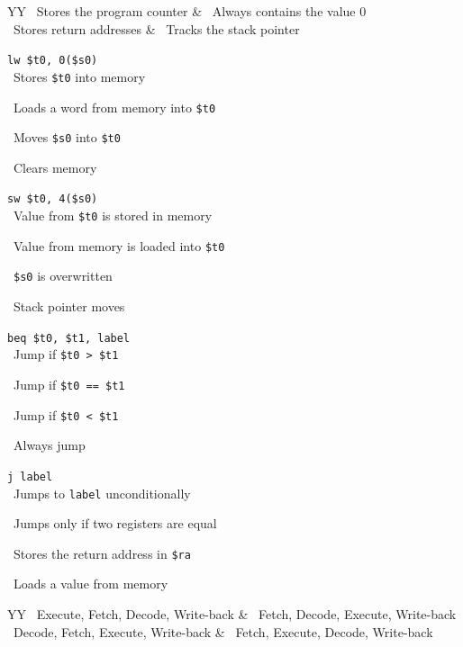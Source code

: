 \begin{tabularx}{\linewidth}{YY}
\formbox\ Stores the program counter & \formbox\ Always contains the value 0 \\
\formbox\ Stores return addresses & \formbox\ Tracks the stack pointer \\
\end{tabularx}

\texttt{lw \$t0, 0(\$s0)}\\
\formbox\ Stores \texttt{\$t0} into memory

\formbox\ Loads a word from memory into \texttt{\$t0}

\formbox\ Moves \texttt{\$s0} into \texttt{\$t0}

\formbox\ Clears memory

\texttt{sw \$t0, 4(\$s0)}\\
\formbox\ Value from \texttt{\$t0} is stored in memory

\formbox\ Value from memory is loaded into \texttt{\$t0}

\formbox\ \texttt{\$s0} is overwritten

\formbox\ Stack pointer moves

\texttt{beq \$t0, \$t1, label}\\
\formbox\ Jump if \texttt{\$t0 > \$t1}

\formbox\ Jump if \texttt{\$t0 == \$t1}

\formbox\ Jump if \texttt{\$t0 < \$t1}

\formbox\ Always jump

\texttt{j label}\\
\formbox\ Jumps to \texttt{label} unconditionally

\formbox\ Jumps only if two registers are equal

\formbox\ Stores the return address in \texttt{\$ra}

\formbox\ Loads a value from memory

\begin{tabularx}{\linewidth}{YY}
\formbox\ Execute, Fetch, Decode, Write-back & \formbox\ Fetch, Decode, Execute, Write-back \\
\formbox\ Decode, Fetch, Execute, Write-back & \formbox\ Fetch, Execute, Decode, Write-back \\
\end{tabularx}

